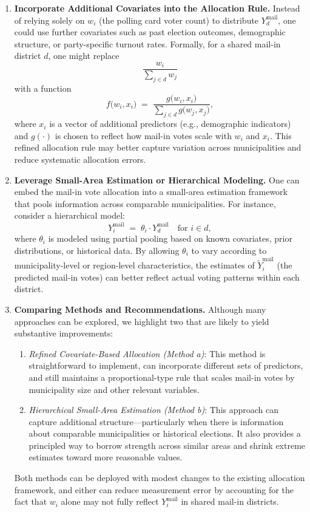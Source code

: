 \documentclass[12pt]{article}
\newcommand{\mail}{\text{mail}}
\begin{document}
\begin{enumerate}[label=(\alph*)]
    \item \textbf{Incorporate Additional Covariates into the Allocation Rule.} 
    Instead of relying solely on $w_i$ (the polling card voter count) to distribute $Y_d^{\mail}$, one could use further covariates such as past election outcomes, demographic structure, or party-specific turnout rates. Formally, for a shared mail-in district $d$, one might replace 
    \[
        \frac{w_i}{\sum_{j \in d} w_j}
    \]
    with a function 
    \[
        f\bigl(w_i, x_i\bigr) \;=\; \frac{g\bigl(w_i, x_i\bigr)}{\sum_{j \in d} g\bigl(w_j, x_j\bigr)},
    \]
    where $x_i$ is a vector of additional predictors (e.g., demographic indicators) and $g(\cdot)$ is chosen to reflect how mail-in votes scale with $w_i$ and $x_i$. This refined allocation rule may better capture variation across municipalities and reduce systematic allocation errors.

    \item \textbf{Leverage Small-Area Estimation or Hierarchical Modeling.}
    One can embed the mail-in vote allocation into a small-area estimation framework that pools information across comparable municipalities. For instance, consider a hierarchical model:
    \[
        Y_i^{\mail} \;=\; \theta_i \cdot Y_d^{\mail}
        \quad\text{for } i \in d,
    \]
    where $\theta_i$ is modeled using partial pooling based on known covariates, prior distributions, or historical data. By allowing $\theta_i$ to vary according to municipality-level or region-level characteristics, the estimates of $\widetilde{Y}_i^{\mail}$ (the predicted mail-in votes) can better reflect actual voting patterns within each district.

    \item \textbf{Comparing Methods and Recommendations.}
    Although many approaches can be explored, we highlight two that are likely to yield substantive improvements:
    \begin{enumerate}[label=(\roman*)]
        \item \emph{Refined Covariate-Based Allocation (Method a)}: This method is straightforward to implement, can incorporate different sets of predictors, and still maintains a proportional-type rule that scales mail-in votes by municipality size and other relevant variables.
        \item \emph{Hierarchical Small-Area Estimation (Method b)}: This approach can capture additional structure—particularly when there is information about comparable municipalities or historical elections. It also provides a principled way to borrow strength across similar areas and shrink extreme estimates toward more reasonable values.
    \end{enumerate}
    Both methods can be deployed with modest changes to the existing allocation framework, and either can reduce measurement error by accounting for the fact that $w_i$ alone may not fully reflect $Y_i^{\mail}$ in shared mail-in districts.
\end{enumerate}
\end{document}
